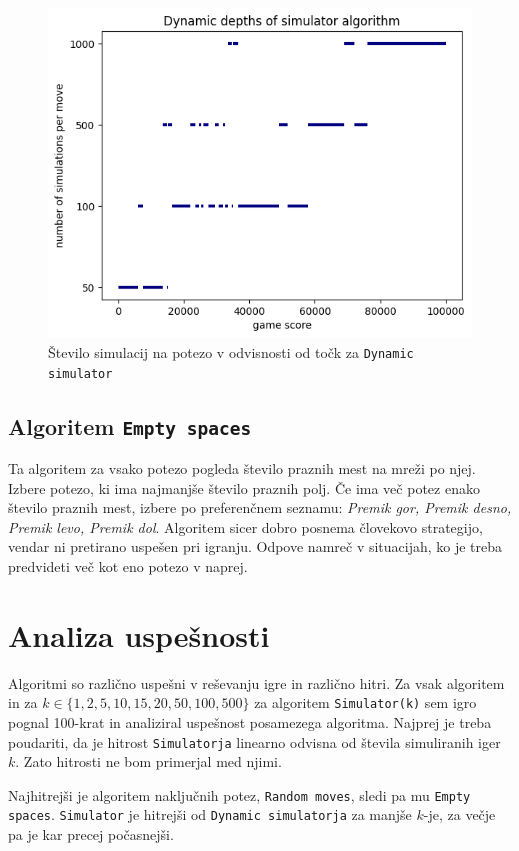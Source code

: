 \documentclass{article}
\begin{document}
\begin{figure}[ht!]
\centering
\includegraphics[width=12cm]{dynamic_sim.png}
\caption{Število simulacij na potezo v odvisnosti od točk za \texttt{Dynamic simulator}}
\label{dynsim}
\end{figure}

\subsection{Algoritem \texttt{Empty spaces}}

Ta algoritem za vsako potezo pogleda število praznih mest na mreži po njej. Izbere potezo, ki ima najmanjše število praznih polj. Če ima več potez enako število praznih mest, izbere po preferenčnem seznamu: \textit{Premik gor, Premik desno, Premik levo, Premik dol}. Algoritem sicer dobro posnema človekovo strategijo, vendar ni pretirano uspešen pri igranju. Odpove namreč v situacijah, ko je treba predvideti več kot eno potezo v naprej.

\section{Analiza uspešnosti}

Algoritmi so različno uspešni v reševanju igre in različno hitri. Za vsak algoritem in za $k \in \{1,2,5,10,15,20,50,100,500\}$ za algoritem \texttt{Simulator(k)} sem igro pognal 100-krat in analiziral uspešnost posamezega algoritma. Najprej je treba poudariti, da je hitrost \texttt{Simulatorja} linearno odvisna od števila simuliranih iger $k$. Zato hitrosti ne bom primerjal med njimi. 

Najhitrejši je algoritem naključnih potez, \texttt{Random moves}, sledi pa mu \texttt{Empty spaces}. \texttt{Simulator} je hitrejši od \texttt{Dynamic simulatorja} za manjše $k$-je, za večje pa je kar precej počasnejši.
\end{document}

